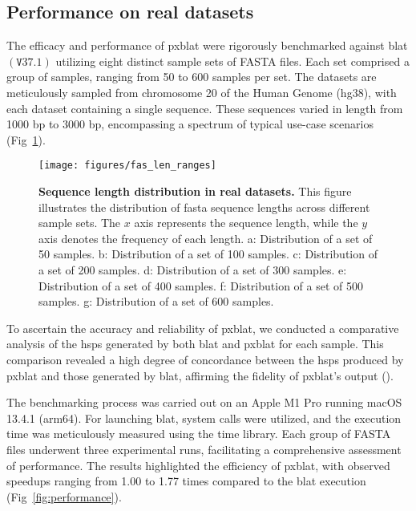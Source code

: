 \documentclass[10pt,letterpaper]{article}
\begin{document}
\subsection*{Performance on real datasets}

The efficacy and performance of \gls{pxblat} were rigorously benchmarked against \gls{blat} \(\left(\mathtt{V}37.1\right)\) utilizing eight distinct sample sets of FASTA files.
Each set comprised a group of samples, ranging from 50 to 600 samples per set.
The datasets are meticulously sampled from chromosome 20 of the Human Genome (hg38), with each dataset containing a single sequence.
These sequences varied in length from \num{1000} bp to \num{3000} bp, encompassing a spectrum of typical use-case scenarios (Fig~\ref{fig:fas_len}).

\begin{figure}[!h]
	\caption{{\bf Sequence length distribution in real datasets.} This figure illustrates the distribution of fasta sequence lengths across different sample sets. The \(x\) axis represents the sequence length, while the \(y\) axis denotes the frequency of each length.
        a: Distribution of a set of \num{50} samples.
        b: Distribution of a set of \num{100} samples.
        c: Distribution of a set of \num{200} samples.
        d: Distribution of a set of \num{300} samples.
        e: Distribution of a set of \num{400} samples.
        f: Distribution of a set of \num{500} samples.
        g: Distribution of a set of \num{600} samples.
        }
	\texttt{[image: figures/fas\_len\_ranges]}
	\label{fig:fas_len}
\end{figure}

To ascertain the accuracy and reliability of \gls{pxblat}, we conducted a comparative analysis of the \glspl{hsp} generated by both \gls{blat} and \gls{pxblat} for each sample.
This comparison revealed a high degree of concordance between the \glspl{hsp} produced by \gls{pxblat} and those generated by \gls{blat}, affirming the fidelity of \gls{pxblat}'s output ().

The benchmarking process was carried out on an Apple M1 Pro running macOS 13.4.1 (arm64).
For launching \gls{blat}, system calls were utilized, and the execution time was meticulously measured using the time library.
Each group of FASTA files underwent three experimental runs, facilitating a comprehensive assessment of performance.
The results highlighted the efficiency of \gls{pxblat}, with observed speedups ranging from 1.00 to 1.77 times compared to the \gls{blat} execution (Fig~\ref{fig:performance}).
\end{document}
